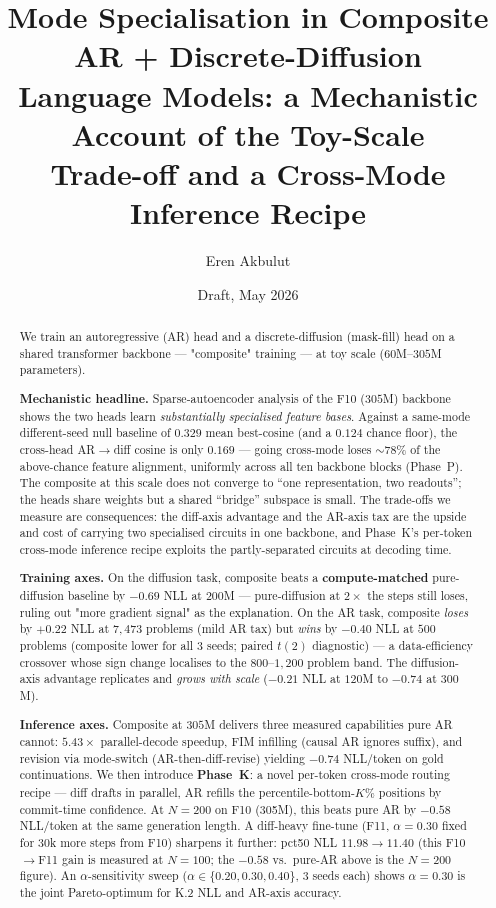 \documentclass[11pt]{article}
\title{Mode Specialisation in Composite AR + Discrete-Diffusion\\
       Language Models: a Mechanistic Account of the Toy-Scale\\
       Trade-off and a Cross-Mode Inference Recipe}
\author{Eren Akbulut}
\date{Draft, May 2026}
\begin{document}
\maketitle

\begin{abstract}
We train an autoregressive (AR) head and a discrete-diffusion
(mask-fill) head on a shared transformer backbone --- "composite"
training --- at toy scale ($60$M--$305$M parameters).

\textbf{Mechanistic headline.} Sparse-autoencoder analysis of the
F10 ($305$M) backbone shows the two heads learn \emph{substantially
specialised feature bases}. Against a same-mode different-seed null
baseline of $0.329$ mean best-cosine (and a $0.124$ chance floor),
the cross-head AR$\to$diff cosine is only $0.169$ --- going cross-mode
loses $\sim\!78\%$ of the above-chance feature alignment, uniformly
across all ten backbone blocks (Phase~P). The composite at this scale
does not converge to ``one representation, two readouts''; the heads
share weights but a shared ``bridge'' subspace is small. The
trade-offs we measure are consequences: the diff-axis advantage and
the AR-axis tax are the upside and cost of carrying two specialised
circuits in one backbone, and Phase~K's per-token cross-mode inference
recipe exploits the partly-separated circuits at decoding time.

\textbf{Training axes.} On the diffusion task, composite beats a
\textbf{compute-matched} pure-diffusion baseline by $-0.69$ NLL at
$200$M --- pure-diffusion at $2\times$ the steps still loses,
ruling out "more gradient signal" as the explanation. On the AR
task, composite \emph{loses} by $+0.22$ NLL at $7{,}473$ problems
(mild AR tax) but \emph{wins} by $-0.40$ NLL at $500$ problems
(composite lower for all $3$ seeds; paired $t(2)$ diagnostic) --- a
data-efficiency crossover whose sign change localises to the
$800$--$1{,}200$ problem band. The diffusion-axis advantage replicates and \emph{grows with
scale} ($-0.21$ NLL at $120$M to $-0.74$ at $300$M).

\textbf{Inference axes.} Composite at $305$M delivers three measured
capabilities pure AR cannot: $5.43\times$ parallel-decode speedup, FIM
infilling (causal AR ignores suffix), and revision via mode-switch
(AR-then-diff-revise) yielding $-0.74$ NLL/token on gold continuations.
We then introduce \textbf{Phase~K}: a novel per-token cross-mode
routing recipe --- diff drafts in parallel, AR refills the
percentile-bottom-$K\%$ positions by commit-time confidence. At $N=200$
on F10 (305M), this beats pure AR by $-0.58$ NLL/token at the same
generation length. A diff-heavy fine-tune (F11, $\alpha\!=\!0.30$ fixed
for $30$k more steps from F10) sharpens it further: pct50 NLL
$11.98 \to 11.40$ (this F10$\to$F11 gain is measured at $N{=}100$; the
$-0.58$ vs.\ pure-AR above is the $N{=}200$ figure). An
$\alpha$-sensitivity sweep ($\alpha \in \{0.20, 0.30, 0.40\}$, $3$
seeds each) shows $\alpha\!=\!0.30$ is the joint Pareto-optimum for
K.2 NLL and AR-axis accuracy.


\end{abstract}
\end{document}
